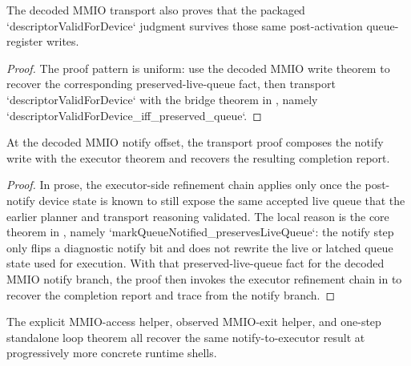 \begin{theorem}
\label{thm:mmio-descriptor-validity}
\leanok
The decoded MMIO transport also proves that the packaged `descriptorValidForDevice` judgment survives those same post-activation queue-register writes.
\end{theorem}

\begin{proof}
\leanok
{}
The proof pattern is uniform: use the decoded MMIO write theorem to recover the corresponding preserved-live-queue fact, then transport `descriptorValidForDevice` with the bridge theorem in , namely `descriptorValidForDevice_iff_preserved_queue`.
\end{proof}

\begin{theorem}
\label{thm:mmio-notify-refinement}
\leanok
At the decoded MMIO notify offset, the transport proof composes the notify write with the executor theorem and recovers the resulting completion report.
\end{theorem}

\begin{proof}
\leanok
{}
In prose, the executor-side refinement chain applies only once the post-notify device state is known to still expose the same accepted live queue that the earlier planner and transport reasoning validated.
The local reason is the core theorem in , namely `markQueueNotified_preservesLiveQueue`: the notify step only flips a diagnostic notify bit and does not rewrite the live or latched queue state used for execution.
With that preserved-live-queue fact for the decoded MMIO notify branch, the proof then invokes the executor refinement chain in  to recover the completion report and trace from the notify branch.
\end{proof}

\begin{theorem}
\label{thm:mmio-shell-refinement}
\leanok
The explicit MMIO-access helper, observed MMIO-exit helper, and one-step standalone loop theorem all recover the same notify-to-executor result at progressively more concrete runtime shells.
\end{theorem}

